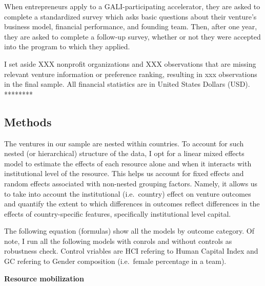 \documentclass[
  english,
  man]{apa6}
\begin{document}
When entrepreneurs apply to a GALI-participating accelerator, they are asked to complete a standardized survey which asks basic questions about their venture's business model, financial performance, and founding team. Then, after one year, they are asked to complete a follow-up survey, whether or not they were accepted into the program to which they applied.

I set aside XXX nonprofit organizations and XXX observations that are missing relevant venture information or preference ranking, resulting in xxx observations in the final sample. All financial statistics are in United States Dollars (USD). ********

\hypertarget{methods}{%
\subsection{Methods}\label{methods}}

The ventures in our sample are nested within countries. To account for such nested (or hierarchical) structure of the data, I opt for a linear mixed effects model to estimate the effects of each resource alone and when it interacts with institutional level of the resource. This helps us account for fixed effects and random effects associated with non-nested grouping factors. Namely, it allows us to take into account the institutional (i.e.~country) effect on venture outcomes and quantify the extent to which differences in outcomes reflect differences in the effects of country-specific features, specifically institutional level capital.

The following equation (formulas) show all the models by outcome category. Of note, I run all the following models with conrols and without controls as robustness check. Control vriables are HCI refering to Human Capital Index and GC refering to Gender composition (i.e.~female percentage in a team).

\textbf{Resource mobilization}
\end{document}
